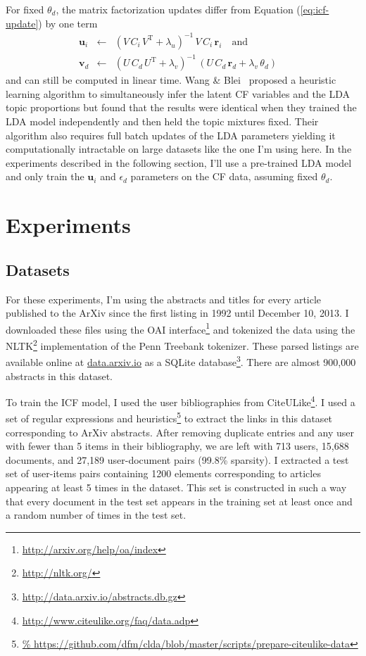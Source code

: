\documentclass[11pt]{article}
\newcommand{\eq}[1]{Equation (\ref{eq:#1})}
\newcommand{\eqlabel}[1]{\label{eq:#1}}
\begin{document}
For fixed $\theta_d$, the matrix factorization updates differ from
\eq{icf-update} by one term \cite{ctr}
\begin{eqnarray}\eqlabel{clda-update}
\mathbf{u}_i &\gets& (V\,C_i\,V^\mathrm{T}+\lambda_u)^{-1}\,
                     V\,C_i\,\mathbf{r}_i
\quad \mathrm{and} \\
\mathbf{v}_d &\gets& (U\,C_d\,U^\mathrm{T} + \lambda_v)^{-1}\,(U\,C_d\,
                     \mathbf{r}_d + \lambda_v\,\theta_d) \quad \nonumber
\end{eqnarray}
and can still be computed in linear time.
Wang \& Blei~ proposed a heuristic learning algorithm to
simultaneously infer the latent CF variables and the LDA topic proportions but
found that the results were identical when they trained the LDA model
independently and then held the topic mixtures fixed.
Their algorithm also requires full batch updates of the LDA parameters
yielding it computationally intractable on large datasets like the one I'm
using here.
In the experiments described in the following section, I'll use a pre-trained
LDA model and only train the $\mathbf{u}_i$ and $\epsilon_d$ parameters on the
CF data, assuming fixed $\theta_d$.

\section{Experiments}

\subsection{Datasets}

For these experiments, I'm using the abstracts and titles for every article
published to the ArXiv since the first listing in 1992 until December 10,
2013.
I downloaded these files using the OAI
interface\footnote{\url{http://arxiv.org/help/oa/index}} and tokenized the
data using the NLTK\footnote{\url{http://nltk.org/}} implementation of the
Penn Treebank tokenizer.
These parsed listings are available online at \url{data.arxiv.io} as a SQLite
database\footnote{\url{http://data.arxiv.io/abstracts.db.gz}}.
There are almost 900,000 abstracts in this dataset.

To train the ICF model, I used the user bibliographies from
CiteULike\footnote{\url{http://www.citeulike.org/faq/data.adp}}.
I used a set of regular expressions and
heuristics\footnote{\url{%
https://github.com/dfm/clda/blob/master/scripts/prepare-citeulike-data}} to
extract the links in this dataset corresponding to ArXiv abstracts.
After removing duplicate entries and any user with fewer than 5 items in their
bibliography, we are left with 713 users, 15,688 documents, and 27,189
user-document pairs (99.8\% sparsity).
I extracted a test set of user-items pairs containing 1200 elements
corresponding to articles appearing at least 5 times in the dataset.
This set is constructed in such a way that every document in the test set
appears in the training set at least once and a random number of times in the
test set.
\end{document}
